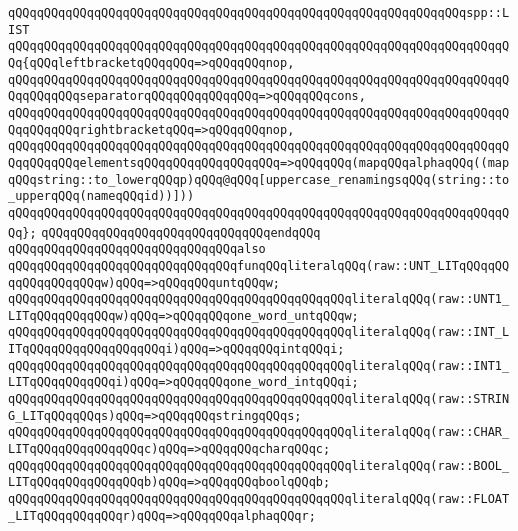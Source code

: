 \verb|qQQqqQQqqQQqqQQqqQQqqQQqqQQqqQQqqQQqqQQqqQQqqQQqqQQqqQQqqQQqqQQqspp::LIST|\newline
\verb|qQQqqQQqqQQqqQQqqQQqqQQqqQQqqQQqqQQqqQQqqQQqqQQqqQQqqQQqqQQqqQQqqQQqqQQq{qQQqleftbracketqQQqqQQq=>qQQqqQQqnop,|\newline
\verb|qQQqqQQqqQQqqQQqqQQqqQQqqQQqqQQqqQQqqQQqqQQqqQQqqQQqqQQqqQQqqQQqqQQqqQQqqQQqqQQqseparatorqQQqqQQqqQQqqQQq=>qQQqqQQqcons,|\newline
\verb|qQQqqQQqqQQqqQQqqQQqqQQqqQQqqQQqqQQqqQQqqQQqqQQqqQQqqQQqqQQqqQQqqQQqqQQqqQQqqQQqrightbracketqQQq=>qQQqqQQqnop,|\newline
\verb|qQQqqQQqqQQqqQQqqQQqqQQqqQQqqQQqqQQqqQQqqQQqqQQqqQQqqQQqqQQqqQQqqQQqqQQqqQQqqQQqelementsqQQqqQQqqQQqqQQqqQQq=>qQQqqQQq(mapqQQqalphaqQQq((mapqQQqstring::to_lowerqQQqp)qQQq@qQQq[uppercase_renamingsqQQq(string::to_upperqQQq(nameqQQqid))]))|\newline
\verb|qQQqqQQqqQQqqQQqqQQqqQQqqQQqqQQqqQQqqQQqqQQqqQQqqQQqqQQqqQQqqQQqqQQqqQQq};|\newline
\verb|qQQqqQQqqQQqqQQqqQQqqQQqqQQqqQQqendqQQq|\newline
\newline
\newline
\verb|qQQqqQQqqQQqqQQqqQQqqQQqqQQqqQQqalso|\newline
\verb|qQQqqQQqqQQqqQQqqQQqqQQqqQQqqQQqfunqQQqliteralqQQq(raw::UNT_LITqQQqqQQqqQQqqQQqqQQqw)qQQq=>qQQqqQQquntqQQqw;|\newline
\verb|qQQqqQQqqQQqqQQqqQQqqQQqqQQqqQQqqQQqqQQqqQQqqQQqliteralqQQq(raw::UNT1_LITqQQqqQQqqQQqw)qQQq=>qQQqqQQqone_word_untqQQqw;|\newline
\verb|qQQqqQQqqQQqqQQqqQQqqQQqqQQqqQQqqQQqqQQqqQQqqQQqliteralqQQq(raw::INT_LITqQQqqQQqqQQqqQQqqQQqi)qQQq=>qQQqqQQqintqQQqi;|\newline
\verb|qQQqqQQqqQQqqQQqqQQqqQQqqQQqqQQqqQQqqQQqqQQqqQQqliteralqQQq(raw::INT1_LITqQQqqQQqqQQqi)qQQq=>qQQqqQQqone_word_intqQQqi;|\newline
\verb|qQQqqQQqqQQqqQQqqQQqqQQqqQQqqQQqqQQqqQQqqQQqqQQqliteralqQQq(raw::STRING_LITqQQqqQQqs)qQQq=>qQQqqQQqstringqQQqs;|\newline
\verb|qQQqqQQqqQQqqQQqqQQqqQQqqQQqqQQqqQQqqQQqqQQqqQQqliteralqQQq(raw::CHAR_LITqQQqqQQqqQQqqQQqc)qQQq=>qQQqqQQqcharqQQqc;|\newline
\verb|qQQqqQQqqQQqqQQqqQQqqQQqqQQqqQQqqQQqqQQqqQQqqQQqliteralqQQq(raw::BOOL_LITqQQqqQQqqQQqqQQqb)qQQq=>qQQqqQQqboolqQQqb;|\newline
\verb|qQQqqQQqqQQqqQQqqQQqqQQqqQQqqQQqqQQqqQQqqQQqqQQqliteralqQQq(raw::FLOAT_LITqQQqqQQqqQQqr)qQQq=>qQQqqQQqalphaqQQqr;|\newline
